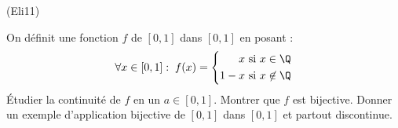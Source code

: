 \begin{tiny}(Eli11)\end{tiny}
 On définit une fonction $f$ de $[0,1]$ dans $[0,1]$ en posant :
\begin{displaymath}
 \forall x \in [0,1]:\;f(x)=
\left\lbrace
\begin{aligned}
 x   &\text{ si } x\in \Q \\
 1-x &\text{ si } x \not \in \Q
\end{aligned}
\right. 
\end{displaymath}
\'Etudier la continuité de $f$ en un $a\in [0,1]$. Montrer que $f$ est bijective.
Donner un exemple d'application bijective de $[0,1]$ dans $[0,1]$ et partout discontinue.